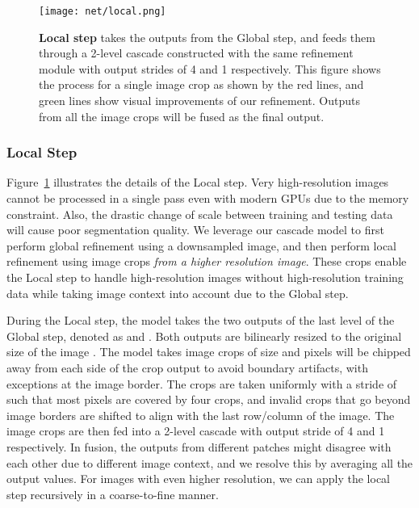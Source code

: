 \documentclass[10pt,twocolumn,letterpaper]{article}
\begin{document}
\begin{figure}[t]
\begin{center}
    \texttt{[image: net/local.png]}
\end{center}
    \vspace{-0.15in}
	\caption{\textbf{Local step} takes the outputs from the Global step, and feeds them through a 2-level cascade constructed with the same refinement module with output strides of 4 and 1 respectively. This figure shows the process for a single image crop as shown by the red lines, and green lines show visual improvements of our refinement. Outputs from all the image crops will be fused as the final output. 
	}
	\label{fig:local_fig}
	\vspace{-0.3in}
\end{figure}

\subsubsection{Local Step}
Figure~\ref{fig:local_fig} illustrates the details of the Local step.
Very high-resolution images cannot be processed in a single pass even with modern GPUs due to the memory constraint. Also, the drastic change of scale between training and testing data will cause poor segmentation quality. We leverage our cascade model to first perform global refinement using a downsampled image, and then perform local refinement using image crops {\em from a higher resolution image}. These crops enable the Local step to handle high-resolution images without high-resolution training data while taking image context into account due to the Global step.

During the Local step, the model takes the two outputs of the last level of the Global step, denoted as  and . Both outputs are bilinearly resized to the original size of the image .
The model takes image crops of size  and  pixels will be chipped away from each side of the crop output to avoid boundary artifacts, with exceptions at the image border. The crops are taken uniformly with a stride of  such that most pixels are covered by four crops, and invalid crops that go beyond image borders are shifted to align with the last row/column of the image.
The image crops are then fed into a 2-level cascade with output stride of 4 and 1 respectively.
In fusion, the outputs from different patches might disagree with each other due to different image context, and we resolve this by averaging all the output values. 
For images with even higher resolution, we can apply the local step recursively in a coarse-to-fine manner. 
\end{document}

